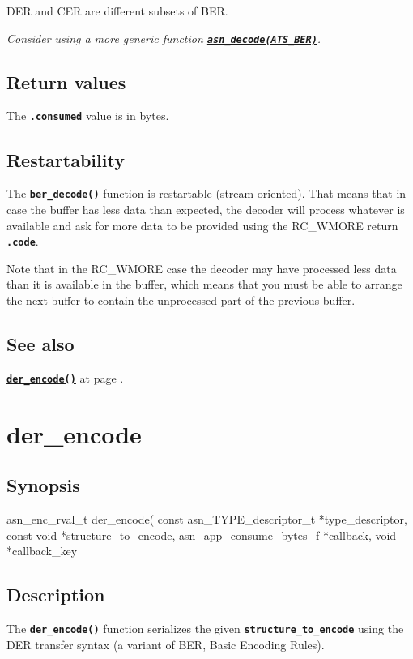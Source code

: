 \documentclass[english,oneside,12pt]{book}
\newcommand{\apisection}[2]{\clearpage\section{\label{#1}#2}}
\newcommand{\api}[2]{\hyperref[#1]{\code{#2}}}
\newcommand{\seealso}[2]{\api{#1}{#2} at page \pageref{#1}}
\newcommand{\code}[1]{\texttt{\textbf{\lstinline{#1}}}}
\begin{document}
DER and CER are different subsets of BER.\newline

\noindent\emph{Consider using a more generic function \api{sec:asn_decode}{asn_decode(ATS_BER)}.}

\subsection*{Return values}


The \code{.consumed} value is in bytes.

\subsection*{Restartability}

The \code{ber_decode()} function is restartable (stream-oriented).
That means that in case the buffer has less data than expected,
the decoder will process whatever is available and ask for more data
to be provided using the RC\_WMORE return \code{.code}.

Note that in the RC\_WMORE case the decoder may have processed less data than
it is available in the buffer, which means that you must be able to arrange
the next buffer to contain the unprocessed part of the previous buffer.

\subsection*{See also}
\seealso{sec:der_encode}{der_encode()}.

\apisection{sec:der_encode}{der\_encode}

\subsection*{Synopsis}

\begin{signature}
asn_enc_rval_t der_encode(
    const asn_TYPE_descriptor_t *type_descriptor,
    const void *structure_to_encode,
    asn_app_consume_bytes_f *callback,
    void *callback_key
\end{signature}

\subsection*{Description}

The \code{der_encode()} function serializes the given \code{structure_to_encode} using the DER transfer syntax (a variant of BER, Basic Encoding Rules).
\end{document}
